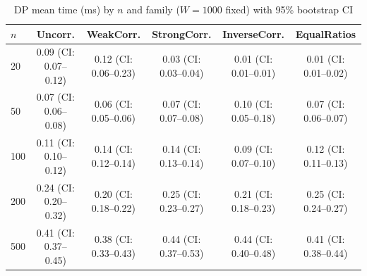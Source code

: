 \begin{table}[tb]
\centering
\caption{DP mean time (ms) by $n$ and family ($W=1000$ fixed) with 95\% bootstrap CI}
\label{tab:dp-scaling}
\begin{tabular}{lccccc}
\toprule
$n$ & Uncorr. & WeakCorr. & StrongCorr. & InverseCorr. & EqualRatios \\
\midrule
20 & 0.09 (CI: 0.07–0.12) & 0.12 (CI: 0.06–0.23) & 0.03 (CI: 0.03–0.04) & 0.01 (CI: 0.01–0.01) & 0.01 (CI: 0.01–0.02) \\
50 & 0.07 (CI: 0.06–0.08) & 0.06 (CI: 0.05–0.06) & 0.07 (CI: 0.07–0.08) & 0.10 (CI: 0.05–0.18) & 0.07 (CI: 0.06–0.07) \\
100 & 0.11 (CI: 0.10–0.12) & 0.14 (CI: 0.12–0.14) & 0.14 (CI: 0.13–0.14) & 0.09 (CI: 0.07–0.10) & 0.12 (CI: 0.11–0.13) \\
200 & 0.24 (CI: 0.20–0.32) & 0.20 (CI: 0.18–0.22) & 0.25 (CI: 0.23–0.27) & 0.21 (CI: 0.18–0.23) & 0.25 (CI: 0.24–0.27) \\
500 & 0.41 (CI: 0.37–0.45) & 0.38 (CI: 0.33–0.43) & 0.44 (CI: 0.37–0.53) & 0.44 (CI: 0.40–0.48) & 0.41 (CI: 0.38–0.44) \\
\bottomrule
\end{tabular}
\end{table}
